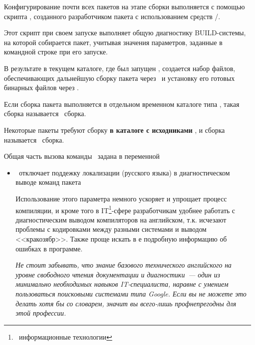 
Конфигурирование почти всех пакетов на этапе сборки выполняется с помощью
скрипта , созданного разработчиком пакета с
использованием средств /.

Этот скрипт при своем запуске выполняет общую диагностику BUILD-системы, на
которой собирается пакет, учитывая значения параметров, заданные в командной
строке при его запуске.

В результате в текущем каталоге, где был запущен , создается
набор файлов, обеспечивающих дальнейшую сборку пакета через \ и
установку его готовых бинарных файлов через .

Если сборка пакета выполняется в отдельном временном каталоге типа
, такая сборка называется \ сборка.

Некоторые пакеты требуют сборку \textbf{в каталоге с исходниками}
, и сборка называется \ сборка.

Общая часть вызова команды \ задана в переменной 



\begin{itemize}
  \item {}\ отключает поддежку локализации (русского языка) в
  диагностическом выводе команд пакета
  
  Использование этого параметра немного ускоряет и упрощает процесс компиляции,
  и кроме того в IT\footnote{\ информационные технологии}-сфере разработчикам
  удобнее работать с диагностическим выводом компиляторов на английском, т.к.
  исчезают проблемы с кодировками между разными системами и выводом
  <<кракозябр>>. Также проще искать в \internet е подробную информацию об
  ошибках в программе.
  
  \emph{Не стоит забывать, что знание базового технического английского на
  уровне свободного чтения документации и диагностики\ --- один из минимально
  необходимых навыков IT-специалиста, наравне с умением пользоваться поисковыми
  системами типа Google. Если вы не можете это делать хотя бы со словарем,
  значит вы всего-лишь профнепрегодны для этой профессии.}
\end{itemize}

\secup
{}
\secdown

